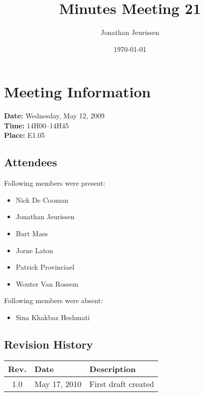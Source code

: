 \documentclass[a4paper, 12pt]{article}
\begin{document}
\title{Minutes Meeting 21}
\author{Jonathan Jeurissen}
\date{\today}

\maketitle	
	\section{Meeting Information}
		\textbf{Date:} Wednesday, May 12, 2009\\
		\textbf{Time:} 14H00--14H45\\
		\textbf{Place:} E1.05\\
		\subsection{Attendees}
Following members were present:
			\begin{itemize}
				\item Nick De Cooman
				\item Jonathan Jeurissen
				\item Bart Maes
				\item Jorne Laton
				\item Patrick Provinciael
				\item Wouter Van Rossem
				
			\end{itemize}

Following members were absent:
			\begin{itemize}
				\item Sina Khakbaz Heshmati
			\end{itemize}
			
		\subsection{Revision History}
			\begin{tabular}{c | l | l }
				\textbf{Rev.} & \textbf{Date} & \textbf{Description} \\
				\hline
				1.0 & May 17, 2010 & First draft created \\
			\end{tabular}		
\end{document}
